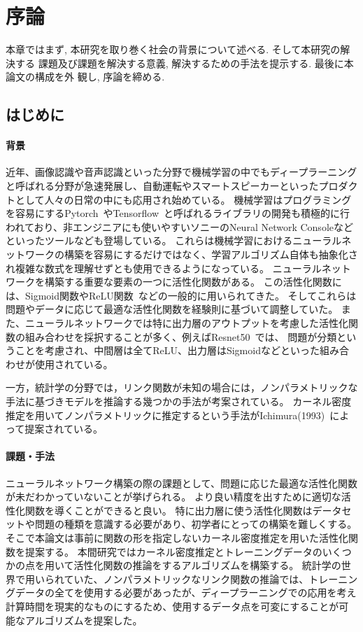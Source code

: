 \chapter{序論}
\label{introduction}

本章ではまず, 本研究を取り巻く社会の背景について述べる. そして本研究の解決する
課題及び課題を解決する意義, 解決するための手法を提示する. 最後に本論文の構成を外
観し, 序論を締める.

\section{はじめに}
\label{introduction:background}

\subsubsection{背景}


近年、画像認識や音声認識といった分野で機械学習の中でもディープラーニングと呼ばれる分野が急速発展し、自動運転やスマートスピーカーといったプロダクトとして人々の日常の中にも応用され始めている。
機械学習はプログラミングを容易にするPytorch~\cite{pytorch}やTensorflow~\cite{tensorflow}と呼ばれるライブラリの開発も積極的に行われており、非エンジニアにも使いやすいソニーのNeural Network Consoleなどといったツールなども登場している。
これらは機械学習におけるニューラルネットワークの構築を容易にするだけではなく、学習アルゴリズム自体も抽象化され複雑な数式を理解せずとも使用できるようになっている。
ニューラルネットワークを構築する重要な要素の一つに活性化関数がある。
この活性化関数には、Sigmoid関数やReLU関数~\cite{ReLU}などの一般的に用いられてきた。
そしてこれらは問題やデータに応じて最適な活性化関数を経験則に基づいて調整していた。
また、ニューラルネットワークでは特に出力層のアウトプットを考慮した活性化関数の組み合わせを採択することが多く、例えばResnet50~\cite{resnet50}では、
問題が分類ということを考慮され、中間層は全てReLU、出力層はSigmoidなどといった組み合わせが使用されている。

一方，統計学の分野では，リンク関数が未知の場合には，ノンパラメトリックな手法に基づきモデルを推論する幾つかの手法が考案されている。
カーネル密度推定を用いてノンパラメトリックに推定するという手法がIchimura(1993)~\cite{ichimura}によって提案されている。

\subsubsection{課題・手法}

ニューラルネットワーク構築の際の課題として、問題に応じた最適な活性化関数が未だわかっていないことが挙げられる。
より良い精度を出すために適切な活性化関数を導くことができると良い。
特に出力層に使う活性化関数はデータセットや問題の種類を意識する必要があり、初学者にとっての構築を難しくする。
そこで本論文は事前に関数の形を指定しないカーネル密度推定を用いた活性化関数を提案する。
本間研究ではカーネル密度推定とトレーニングデータのいくつかの点を用いて活性化関数の推論をするアルゴリズムを構築する。
統計学の世界で用いられていた、ノンパラメトリックなリンク関数の推論では、トレーニングデータの全てを使用する必要があったが、ディープラーニングでの応用を考え
計算時間を現実的なものにするため、使用するデータ点を可変にすることが可能なアルゴリズムを提案した。

